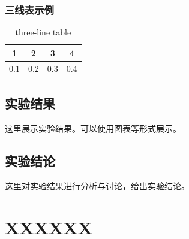 \documentclass[a4paper,12pt]{ctexart}
\begin{document}
\subsubsection{三线表示例}
\begin{table}[htbp]
    \centering
    \caption{three-line table}
    \begin{tabular}{cccc}
        \toprule  %
        1   & 2   & 3   & 4   \\
        \midrule  %
        0.1 & 0.2 & 0.3 & 0.4 \\
        \bottomrule  %
    \end{tabular}
\end{table}


\subsection{实验结果}
这里展示实验结果。可以使用图表等形式展示。

\subsection{实验结论}
这里对实验结果进行分析与讨论，给出实验结论。

\newpage
\section{XXXXXX}
\end{document}
